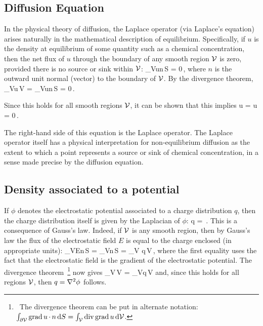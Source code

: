 \subsection{Diffusion Equation}
In the physical theory of diffusion, the Laplace operator (via Laplace's equation) arises naturally in the mathematical description of equilibrium. Specifically, if $u$ is the density at equilibrium of some quantity such as a chemical concentration, then the net flux of $u$ through the boundary of any smooth region $\mathcal{V}$ is zero, provided there is no source or sink within $\mathcal{V}$:
\beq
\int_{\bound\region V}\grad u\iprod n\,\dx S = 0\,,
\eeq
where $n$ is the outward unit normal (vector) to the boundary of $\mathcal{V}$. By the divergence theorem,
\beq
\int_{\region V}\div\grad u\,\dx\region V = \int_{\bound\region V}\grad u\iprod n\,\dx S = 0\,.
\eeq

Since this holds for all smooth regions $\mathcal{V}$, it can be shown that this implies
\beq
\div\grad u = \lder u = 0\,.
\eeq

The right-hand side of this equation is the Laplace operator. The Laplace operator itself has a physical interpretation for non-equilibrium diffusion as the extent to which a point represents a source or sink of chemical concentration, in a sense made precise by the diffusion equation.


\subsection{Density associated to a potential}
If $\phi$ denotes the electrostatic potential associated to a charge distribution $q$, then the charge distribution itself is given by the Laplacian of $\phi$:
\beq
q = \lder\phi \,.
\eeq
This is a consequence of Gauss's law. Indeed, if $\mathcal{V}$ is any smooth region, then by Gauss's law the flux of the electrostatic field $E$ is equal to the charge enclosed (in appropriate units):
\beq
\int_{\bound\region V}E\iprod n\,\dx S = \int_{\bound\region V}\grad\phi\iprod n\,\dx S
    = \int_{\region V} q\,\dx\region V\,,
\eeq
where the first equality uses the fact that the electrostatic field is the gradient of the electrostatic potential. The divergence theorem~\footnote{~The divergence theorem can be put in alternate notation: $\int_{\partial\mathcal{V}}\operatorname{grad} u\operatorname{\cdot} n\,\text{d} S = \int_{\mathcal{V}}\operatorname{div}\operatorname{grad} u\,\text{d}\mathcal{V}$.} now gives
\beq
\int_{\region V}\lder\phi\,\dx\region V = \int_{\region V}q\,\dx\region V
\eeq
and, since this holds for all regions $\mathcal{V}$, then $q = \nabla^2\phi$ follows.

